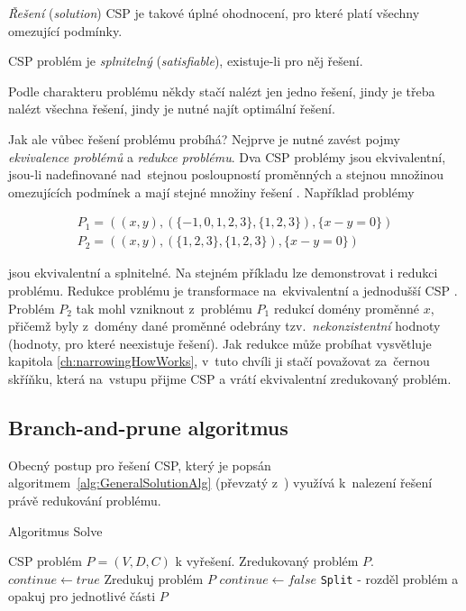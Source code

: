 \begin{definition}
\label{def:solution}
\emph{Řešení} (\emph{solution}) CSP je takové úplné ohodnocení, pro které platí všechny omezující podmínky.
\end{definition}

\begin{definition}
\label{def:satisfiability}
CSP problém je \emph{splnitelný} (\emph{satisfiable}), existuje-li pro něj řešení.
\end{definition}

Podle charakteru problému někdy stačí nalézt jen jedno řešení, jindy je třeba nalézt všechna řešení, jindy je nutné najít optimální řešení.

Jak ale vůbec řešení problému probíhá? Nejprve je nutné zavést pojmy \emph{ekvivalence problémů} a \emph{redukce problému}. Dva CSP problémy jsou ekvivalentní, jsou-li nadefinované nad~stejnou posloupností proměnných a stejnou množinou omezujících podmínek a mají stejné množiny řešení \cite[s.~18]{Vu2005}. Například problémy

\begin{align*}
P_1 = ((x, y), (\{-1,0,1,2,3\}, \{1,2,3\}), \{x - y = 0\}) \\
P_2 = ((x, y), (\{1,2,3\}, \{1,2,3\}), \{x - y = 0\})
\end{align*}

jsou ekvivalentní a splnitelné. Na stejném příkladu lze demonstrovat i redukci problému. Redukce problému je transformace na~ekvivalentní a jednodušší CSP \cite[s.~23]{Vu2005}. Problém $P_2$ tak mohl vzniknout z~problému $P_1$ redukcí domény proměnné $x$, přičemž byly z~domény dané proměnné odebrány tzv.~\emph{nekonzistentní} hodnoty (hodnoty, pro které neexistuje řešení). Jak redukce může probíhat vysvětluje kapitola \ref{ch:narrowingHowWorks}, v~tuto chvíli ji stačí považovat za~černou skříňku, která na~vstupu přijme CSP a vrátí ekvivalentní zredukovaný problém.

\subsection{Branch-and-prune algoritmus}

Obecný postup pro řešení CSP, který je popsán algoritmem~\ref{alg:GeneralSolutionAlg} (převzatý z~\cite[s.~22]{Vu2005}) využívá k~nalezení řešení právě redukování problému.

\begin{algorithm}
\caption{Algoritmus Solve}
\label{alg:GeneralSolutionAlg}
\begin{algorithmic}[1]
\Require CSP problém $P = (V, D, C)$ k vyřešení.
\Ensure Zredukovaný problém $P$.
\State $continue \gets true$
\State Zredukuj problém $P$
\State $continue \gets false$
\Else
\State \verb|Split| - rozděl problém a opakuj pro jednotlivé části
\EndIf
\Else
\State\Return $P$
\EndIf
\EndWhile
\EndProcedure
\end{algorithmic}
\end{algorithm}

